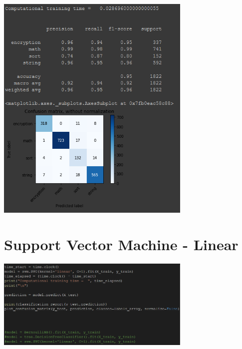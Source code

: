 \documentclass[11pt]{scrartcl}
\begin{document}
{\begin{center}
	\vspace{0.1cm}
	\hspace{+0.2in}\includegraphics[width=0.7\textwidth]{bernoulli_matrix.png}
	\vspace{0.3cm}
\end{center}

\newpage
\section{Support Vector Machine - Linear}

\begin{center}
	\vspace{0.2cm}
	\hspace{+0.2in}\includegraphics[width=0.7\textwidth]{svm.png}
	\vspace{0.1cm}
	

\end{center}}
\end{document}
